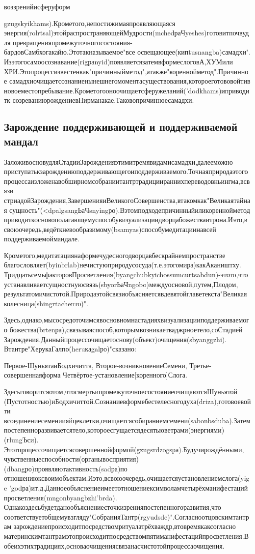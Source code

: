 воззренийисферуформ{gzugskyikhams).Крометого,непостижимаяпроявляющаяся
энергия(rolrtsal)этойраспространяющейМудрости(mchedраЧyeshes)готовитпочвудля
превращенияпромежуточногосостояния-бардовСамбхогакайю.Этотакназываемое"все
освещающее(кипtusnangba)самадхи".
Изэтогосамоосознавание(rigраnyid)появляетсязатемвформеслоговА,ХУМили
ХРИ.Этопроцессизвестенкак"причинныйметод",атакже"кореннойметод".Причинное
самадхиочищаетсознаниенынешнегомоментасуществования,котороеготововойтив
новоеместопребывание.Крометогооноочищаетсферужеланий('dodkhams)иприводитк
созреваниюрождениевНирманакае.Таковопричинноесамадхи.

\subsection{Зарождение поддерживающей и поддерживаемой мандал}

ЗаложивосновудляСтадииЗарожденияэтимитремявидамисамадхи,далееможно
приступатькзарождениюподдерживающегоиподдерживаемого.Точнаяприродаэтого
процессаизложенавобширномсобраниитантртрадициираннихпереводовньингма,всвязи
стриадойЗарождения,ЗавершенияиВеликогоСовершенства,втакомкак"Великаятайная
сущность"(<dpalgsangЬаЧsnyingро).Вэтомподходепричинныйиликореннойметод
приводиткосновополагающемуспособувизуализациидворцабожестваитрона.Иэто,в
своюочередь,ведёткневообразимому(bsamyas)способумедитациинавсей
поддерживаемоймандале.

Крометого,медитатациянаформечудесногодворцавбескрайнемпространстве
благословляет(byinbrlab)нечистуюприродусосуда(т.е.этогомира)какАкаништху.
ТридцатьсемьфакторовПросветления(byangchubkyichossumcurtsabdun)-этото,что
устанавливаетсущностнуюсвязь(sbyorЬаЧngobo)междуосновой,путем,Плодом,
результатомичистотой.Природаэтойсвязиобъясняетсявдевятойглаветекста"Великая
колесница(shingrtachenто)".

Здесь,однако,мысосредоточимсявосновномнастадияхвизуализацииподдерживаемого
божества(brtenра),связываяспособ,которымвозникаетваджрноетело,соСтадией
Зарождения.Данныйпроцессочищаетоснову(объект)очищения(sbyanggzhi).
Втантре"ХерукаГалпо(heruкаgalро)"сказано:

Первое-ШуньятаиБодхичитта,
Второе-возникновениеСемени,
Третье-совершеннаяформа
Четвёртое-установление[коренного]Слога.

Здесьговоритсяотом,чтосмертьипромежуточноесостояниеочищаютсяШуньятой
(Пустотностью)иБодхичиттой.Сознаниевформебестелесногодуха(driza),готовоевойти
всоединениесемениияйцеклетки,очищаетсясобираниемсемени(sabonbsduba).Затем
постепенноразвиваетсятело,котороесгущаетсядесятьюветрами(энергиями)(гlungЪси).
Этотпроцессочищаетсясовершеннойформой(gzugsrdzogsра).Будучирождёнными,
чувственныеспособности(органывосприятия)(dbangро)проявляютактивность(sadра)по
отношениюксвоимобъектам.Иэто,всвоюочередь,очищаетсяустановлениемслога(yige
'godра)ит.д.Данноеобъяснениеимеетотношениексимволамчетырёхманифестаций
просветления(mngonbyangbzhi'brda).
Однакоздесьбудетданообъяснениесточкизренияпостепенногоразвития,что
соответствуетобщемувзгляду"СобранияТантр(rgyudsde)".Согласноотцовскимтантрам
зарождениепроисходитпосредствомритуалатрёхваждр,втовремякаксогласно
материнскимтантрамэтопроисходитпосредствомпятиманифестацийпросветления.В
обеихэтихтрадициях,основаочищениясвязанасчистотойпроцессаочищения.

}
